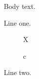 \documentclass{article}
\begin{document}
Body text.
\begin{titlepage}
Line one.
\begin{figure}[htb]X\caption{c}\end{figure}
Line two.
\end{titlepage}
\end{document}
